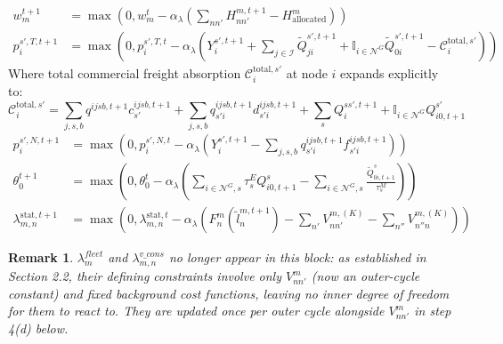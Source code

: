 \documentclass[11pt,a4paper]{article}
\newtheorem{remark}{Remark}
\newcommand{\Proj}[1]{\max\left(0, #1\right)}
\begin{document}
\begin{enumerate}
\begin{enumerate}
\begin{enumerate}
\begin{align}
                w_{m}^{t+1} &= \Proj{ w_{m}^t - \alpha_{\lambda} \left( \sum_{nn'} H_{nn'}^{m,t+1} - H^m_{\text{allocated}} \right) } \\
                p_i^{s', T, t+1} &= \Proj{ p_i^{s', T,t} - \alpha_{\lambda} \left( Y_i^{s',t+1} + \sum_{j \in \mathcal{I}} \tilde{Q}_{ji}^{s',t+1} + \mathbb{I}_{i \in \mathcal{N}^G} \tilde{Q}_{0i}^{s',t+1} - \mathcal{C}^{\text{total}, s'}_i \right) }
            \end{align}
            Where total commercial freight absorption $\mathcal{C}^{\text{total}, s'}_i$ at node $i$ expands explicitly to:
            \begin{equation}
                \mathcal{C}^{\text{total}, s'}_i = \sum_{j,s,b} q^{ijsb,t+1} c^{ijsb,t+1}_{s'} + \sum_{j,s,b} q^{ijsb,t+1}_{s'i} d^{ijsb,t+1}_{s'i} + \sum_{s} Q^{ss',t+1}_i + \mathbb{I}_{i \in \mathcal{N}^G} Q^{s'}_{i0,t+1}
            \end{equation}
            \begin{align}
                p_i^{s', N, t+1} &= \Proj{ p_i^{s', N,t} - \alpha_{\lambda} \left( Y_i^{s',t+1} - \sum_{j,s,b} q^{ijsb,t+1}_{s'i} f^{ijsb,t+1}_{s'i} \right) } \\
                \theta_0^{t+1} &= \Proj{ \theta_0^t - \alpha_{\lambda} \left( \sum_{i \in \mathcal{N}^G, s} \tau^E_s Q^s_{i0,t+1} - \sum_{i \in \mathcal{N}^G, s} \frac{\tilde{Q}^s_{0i,t+1}}{\tau^M_s} \right) } \\
                \lambda^{\text{stat}, t+1}_{m,n} &= \Proj{ \lambda^{\text{stat},t}_{m,n} - \alpha_{\lambda} \left( F_n^m(\tilde{l}^{m,t+1}_n) - \sum_{n'} V_{nn'}^{m,(K)} - \sum_{n''} V_{n''n}^{m,(K)} \right) }
            \end{align}
            \begin{remark}
            $\lambda^{fleet}_m$ and $\lambda^{v\_cons}_{m,n}$ no longer appear in this block: as established in Section 2.2, their defining constraints involve only $V^m_{nn'}$ (now an outer-cycle constant) and fixed background cost functions, leaving no inner degree of freedom for them to react to. They are updated once per outer cycle alongside $V^m_{nn'}$ in step 4(d) below.
            \end{remark}


\end{enumerate}
\end{enumerate}
\end{enumerate}
\end{document}
